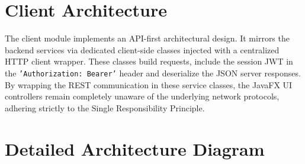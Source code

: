 \section{Client Architecture}
The client module implements an API-first architectural design. It mirrors the backend services via dedicated client-side classes injected with a centralized HTTP client wrapper. These classes build requests, include the session JWT in the \texttt{'Authorization: Bearer'} header and deserialize the JSON server responses. By wrapping the REST communication in these service classes, the JavaFX UI controllers remain completely unaware of the underlying network protocols, adhering strictly to the Single Responsibility Principle.

\section{Detailed Architecture Diagram}

